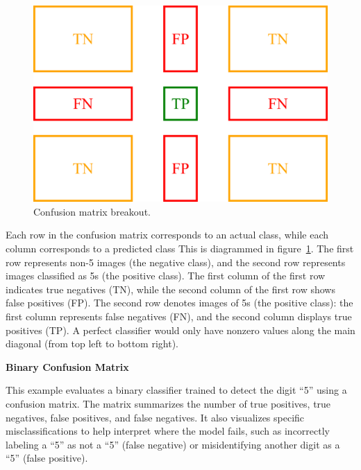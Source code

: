 \documentclass[12pt,letter]{article}
\begin{document}
\begin{figure}[H]
    \centering
    \includegraphics[]{../figures/confusion_matrix_breakout.png}
    \caption{Confusion matrix breakout.}
    \label{fig:confusion_matrix_breakout}
\end{figure}


Each row in the confusion matrix corresponds to an actual class, while each column corresponds to a predicted class This is diagrammed in figure~\ref{fig:confusion_matrix_breakout}. The first row represents non-5 images (the negative class), and the second row represents images classified as 5s (the positive class). The first column of the first row indicates true negatives (TN), while the second column of the first row shows false positives (FP). The second row denotes images of 5s (the positive class): the first column represents false negatives (FN), and the second column displays true positives (TP). A perfect classifier would only have nonzero values along the main diagonal (from top left to bottom right).






\begin{example}
\textbf{Binary Confusion Matrix}

\noindent This example evaluates a binary classifier trained to detect the digit ``5'' using a confusion matrix. The matrix summarizes the number of true positives, true negatives, false positives, and false negatives. It also visualizes specific misclassifications to help interpret where the model fails, such as incorrectly labeling a ``5'' as not a ``5'' (false negative) or misidentifying another digit as a ``5'' (false positive).
\end{example}
\end{document}
